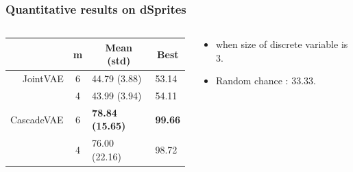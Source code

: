 \documentclass[10pt,mathserif]{beamer}
\begin{document}
\begin{frame}
\frametitle{Quantitative results on dSprites}
\begin{columns}
\begin{column}{0.5\textwidth}
\begin{table}[htbp]
\fontsize{9pt}{9.5pt}\selectfont
\centering
\begin{tabular}{rc ll}
\addlinespace[-\aboverulesep]
\toprule
\multicolumn{1}{c}{Method}&m&\multicolumn{1}{c}{Mean (std)}&\multicolumn{1}{c}{Best}\\
\toprule
JointVAE & 6&44.79 (3.88) &53.14\\
        &  4&43.99 (3.94) &54.11\\
\midrule
CascadeVAE &6&\textbf{78.84 (15.65)}& \textbf{99.66}\\
                &4&76.00 (22.16)& 98.72\\
\bottomrule
\end{tabular}
\end{table}
\end{column}
\begin{column}{0.4\textwidth}
\begin{itemize}\itemsep=12pt
\item {\color{blue}{Unsupervised classification accuracy}} when size of discrete variable is 3.
\item Random chance : $33.33$.
\end{itemize}

\end{column}
\end{columns}
\end{frame}



\end{document}
